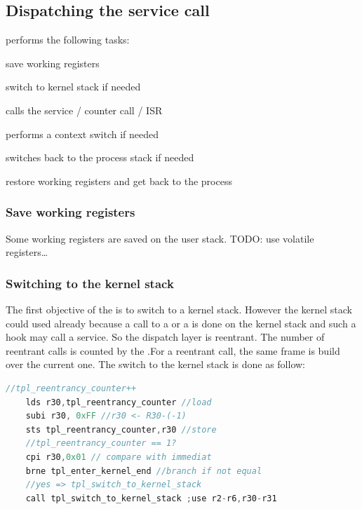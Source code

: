 \subsection{Dispatching the service call}

 performs the following tasks:
\begin{penum}
\item save working registers
\item switch to kernel stack if needed
\item calls the service / counter call / ISR
\item performs a context switch if needed
\item switches back to the process stack if needed
\item restore working registers and get back to the process
\end{penum}

\subsubsection{Save working registers}
Some working registers are saved on the user stack. TODO: use volatile registers…

\subsubsection{Switching to the kernel stack}
The first objective of the  is to switch to a kernel stack. However the kernel stack could used already because a call to a  or a  is done on the kernel stack and such a hook may call a service. So the dispatch layer is reentrant. The number of reentrant calls is counted by the .For a reentrant call, the same frame is build over the current one. The switch to the kernel stack is done as follow:

\begin{lstlisting}[language=C]
	//tpl_reentrancy_counter++
	lds r30,tpl_reentrancy_counter //load
	subi r30, 0xFF //r30 <- R30-(-1)
	sts tpl_reentrancy_counter,r30 //store
	//tpl_reentrancy_counter == 1?
	cpi r30,0x01 // compare with immediat
	brne tpl_enter_kernel_end //branch if not equal
	//yes => tpl_switch_to_kernel_stack
	call tpl_switch_to_kernel_stack ;use r2-r6,r30-r31
\end{lstlisting}

